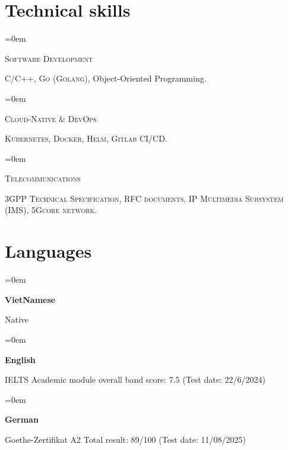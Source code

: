 \documentclass[10pt]{article}
\newlength{\spacebox}
\newcommand{\skill}[2]{
\noindent\hangindent=0em\hangafter=0
\parbox{3\spacebox}{%
\textsc{#1}} %
#2 \par} %
\newcommand{\lan}[2]{
    \noindent\hangindent=0em\hangafter=0
    \parbox{3\spacebox}{%
        \textbf{#1}} %
     #2 \par}    %
\begin{document}
\section*{Technical skills}
\skill{Software Development}{\textsc{C/C++}, \textsc{Go (Golang)}, Object-Oriented Programming.}
\skill{Cloud-Native \& DevOps}{\textsc{Kubernetes, Docker, Helm, Gitlab CI/CD.}}
\skill{Telecommunications}{\textsc{3GPP Technical Specification, RFC documents, IP Multimedia Subsystem (IMS), 5Gcore network.}}

\section*{Languages}
\lan{VietNamese}{Native}
\lan{English}{IELTS Academic module overall band score: 7.5 (Test date: 22/6/2024)}
\lan{German}{Goethe-Zertifikat A2 Total result: 89/100 (Test date: 11/08/2025)}
\end{document}
